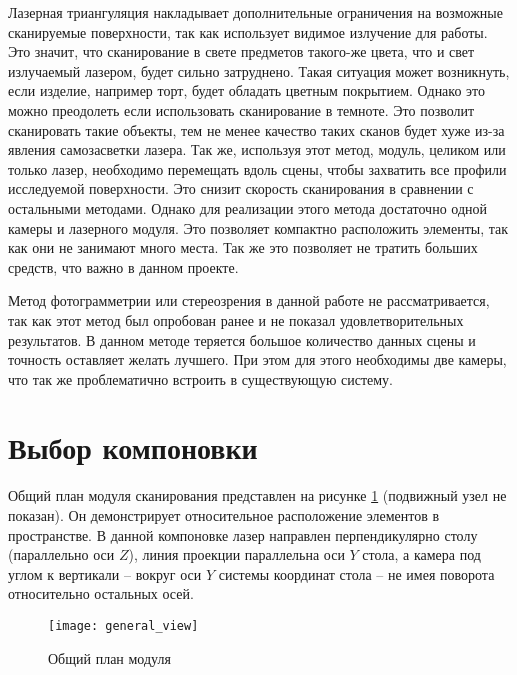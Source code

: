         Лазерная триангуляция накладывает дополнительные ограничения на возможные сканируемые поверхности, так как использует видимое излучение для работы. Это значит, что сканирование в свете предметов такого-же цвета, что и свет излучаемый лазером, будет сильно затруднено. Такая ситуация может возникнуть, если изделие, например торт, будет обладать цветным покрытием. Однако это можно преодолеть если использовать сканирование в темноте. Это позволит сканировать такие объекты, тем не менее качество таких сканов будет хуже из-за явления самозасветки лазера.
        Так же, используя этот метод, модуль, целиком или только лазер, необходимо перемещать вдоль сцены, чтобы захватить все профили исследуемой поверхности. Это снизит скорость сканирования в сравнении с остальными методами.
        Однако для реализации этого метода достаточно одной камеры и лазерного модуля. Это позволяет компактно расположить элементы, так как они не занимают много места. Так же это позволяет не тратить больших средств, что важно в данном проекте.

        Метод фотограмметрии или стереозрения в данной работе не рассматривается, так как этот метод был опробован ранее и не показал удовлетворительных результатов. В данном методе теряется большое количество данных сцены и точность оставляет желать лучшего. При этом для этого необходимы две камеры, что так же проблематично встроить в существующую систему.
        
    \section{Выбор компоновки}
        Общий план модуля сканирования представлен на рисунке \ref{pic:general_view} (подвижный узел не показан). Он демонстрирует относительное расположение элементов в пространстве. В данной компоновке лазер направлен перпендикулярно столу (параллельно оси $ Z $), линия проекции параллельна оси $ Y $ стола, а камера под углом к вертикали -- вокруг оси $ Y $ системы координат стола -- не имея поворота относительно остальных осей.


        \begin{figure}[H]
            \centering
            \texttt{[image: general\_view]}\label{pic:general_view}
            \caption{Общий план модуля}
        \end{figure}

